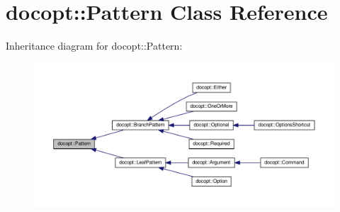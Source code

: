 \hypertarget{classdocopt_1_1Pattern}{}\section{docopt\+:\+:Pattern Class Reference}
\label{classdocopt_1_1Pattern}


Inheritance diagram for docopt\+:\+:Pattern\+:
\nopagebreak
\begin{figure}[H]
\begin{center}
\leavevmode
\includegraphics[width=350pt]{classdocopt_1_1Pattern__inherit__graph}
\end{center}
\end{figure}
